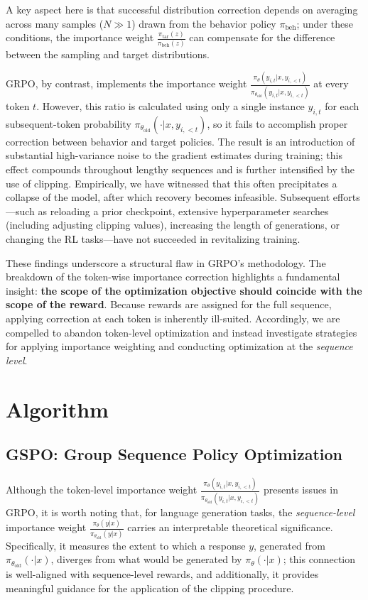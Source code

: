 A key aspect here is that successful distribution correction depends on averaging across many samples ($N \gg 1$) drawn from the behavior policy $\pi_\text{beh}$; under these conditions, the importance weight $\frac{ \pi_\text{tar} (z) }{ \pi_\text{beh} (z)}$ can compensate for the difference between the sampling and target distributions.

GRPO, by contrast, implements the importance weight $\frac{ \pi_{\theta} (y_{i,t} | x, y_{i,<t}) }{ \pi_{\theta_\text{old}} (y_{i,t} | x,y_{i,<t})}$ at every token $t$. However, this ratio is calculated using only a single instance $y_{i,t}$ for each subsequent-token probability $\pi_{\theta_\text{old}}( \cdot | x, y_{i, <t})$, so it fails to accomplish proper correction between behavior and target policies. The result is an introduction of substantial high-variance noise to the gradient estimates during training; this effect compounds throughout lengthy sequences and is further intensified by the use of clipping. Empirically, we have witnessed that this often precipitates a collapse of the model, after which recovery becomes infeasible. Subsequent efforts—such as reloading a prior checkpoint, extensive hyperparameter searches (including adjusting clipping values), increasing the length of generations, or changing the RL tasks—have not succeeded in revitalizing training.

These findings underscore a structural flaw in GRPO’s methodology. The breakdown of the token-wise importance correction highlights a fundamental insight: \textbf{the scope of the optimization objective should coincide with the scope of the reward}. Because rewards are assigned for the full sequence, applying correction at each token is inherently ill-suited. Accordingly, we are compelled to abandon token-level optimization and instead investigate strategies for applying importance weighting and conducting optimization at the \textit{sequence level}.

\section{Algorithm}

\subsection{GSPO: Group Sequence Policy Optimization}

Although the token-level importance weight $\frac{ \pi_{\theta} (y_{i,t} | x, y_{i,<t}) }{ \pi_{\theta_\text{old}} (y_{i,t} | x,y_{i,<t})}$ presents issues in GRPO, it is worth noting that, for language generation tasks, the \textit{sequence-level} importance weight $\frac{ \pi_{\theta} (y | x) }{ \pi_{\theta_\text{old}} (y | x)}$ carries an interpretable theoretical significance. Specifically, it measures the extent to which a response $y$, generated from $\pi_{\theta_\text{old}} (\cdot | x)$, diverges from what would be generated by $\pi_{\theta} (\cdot | x)$; this connection is well-aligned with sequence-level rewards, and additionally, it provides meaningful guidance for the application of the clipping procedure.

